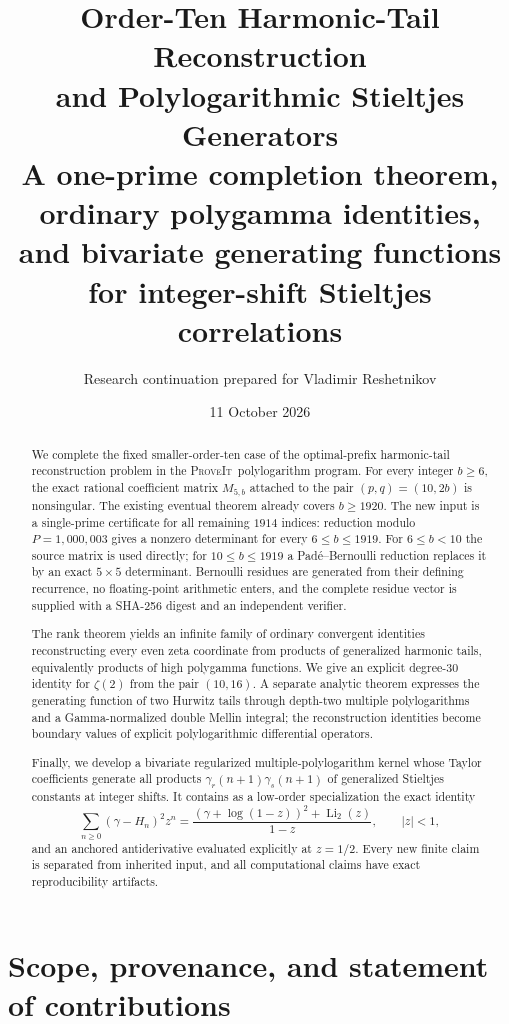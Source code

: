 \documentclass[11pt]{article}
\title{\textbf{Order-Ten Harmonic-Tail Reconstruction\\
and Polylogarithmic Stieltjes Generators}\\[0.4em]
\large A one-prime completion theorem, ordinary polygamma identities,\\
and bivariate generating functions for integer-shift Stieltjes correlations}
\author{Research continuation prepared for Vladimir Reshetnikov}
\date{11 October 2026}
\theoremstyle{definition}
\newcommand{\Li}{\operatorname{Li}}
\newcommand{\Repo}{\textsc{ProveIt}}
\begin{document}
\maketitle

\begin{abstract}
We complete the fixed smaller-order-ten case of the optimal-prefix
harmonic-tail reconstruction problem in the \Repo\ polylogarithm
program.  For every integer $b\ge6$, the exact rational coefficient
matrix $M_{5,b}$ attached to the pair $(p,q)=(10,2b)$ is nonsingular.
The existing eventual theorem already covers $b\ge1920$.  The new
input is a single-prime certificate for all remaining $1914$ indices:
reduction modulo $P=1{,}000{,}003$ gives a nonzero determinant for
every $6\le b\le1919$.  For $6\le b<10$ the source matrix is used
directly; for $10\le b\le1919$ a Pad\'e--Bernoulli reduction replaces
it by an exact $5\times5$ determinant.  Bernoulli residues are generated
from their defining recurrence, no floating-point arithmetic enters,
and the complete residue vector is supplied with a SHA-256 digest and
an independent verifier.

The rank theorem yields an infinite family of ordinary convergent
identities reconstructing every even zeta coordinate from products of
generalized harmonic tails, equivalently products of high polygamma
functions.  We give an explicit degree-$30$ identity for
$\zeta(2)$ from the pair $(10,16)$.  A separate analytic theorem
expresses the generating function of two Hurwitz tails through depth-two
multiple polylogarithms and a Gamma-normalized double Mellin integral;
the reconstruction identities become boundary values of explicit
polylogarithmic differential operators.

Finally, we develop a bivariate regularized multiple-polylogarithm
kernel whose Taylor coefficients generate all products
$\gamma_r(n+1)\gamma_s(n+1)$ of generalized Stieltjes constants at
integer shifts.  It contains as a low-order specialization the exact
identity
\[
 \sum_{n\ge0}(\gamma-H_n)^2z^n
 =\frac{(\gamma+\log(1-z))^2+\Li_2(z)}{1-z},
 \qquad |z|<1,
\]
and an anchored antiderivative evaluated explicitly at $z=1/2$.
Every new finite claim is separated from inherited input, and all
computational claims have exact reproducibility artifacts.
\end{abstract}

\tableofcontents
\newpage

\section{Scope, provenance, and statement of contributions}
\label{sec:scope}
\end{document}
